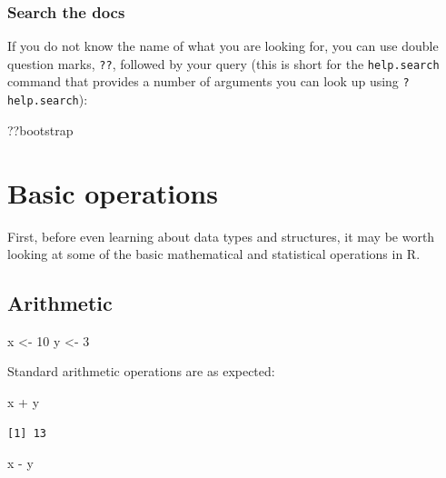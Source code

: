 \documentclass[
]{book}
\newenvironment{Shaded}{\begin{snugshade}}{\end{snugshade}}
\newcommand{\DecValTok}[1]{\textcolor[rgb]{0.00,0.00,0.81}{#1}}
\newcommand{\NormalTok}[1]{#1}
\newcommand{\OtherTok}[1]{\textcolor[rgb]{0.56,0.35,0.01}{#1}}
\newcommand{\SpecialCharTok}[1]{\textcolor[rgb]{0.00,0.00,0.00}{#1}}
\begin{document}
\hypertarget{search-the-docs}{%
\subsection{Search the docs}\label{search-the-docs}}

If you do not know the name of what you are looking for, you can use double question marks, \texttt{??}, followed by your query (this is short for the \texttt{help.search} command that provides a number of arguments you can look up using \texttt{?help.search}):

\begin{Shaded}
\begin{Highlighting}[]
\NormalTok{??bootstrap}
\end{Highlighting}
\end{Shaded}

\hypertarget{basicops}{%
\chapter{Basic operations}\label{basicops}}

First, before even learning about data types and structures, it may be worth looking at some of the basic mathematical and statistical operations in R.

\hypertarget{arithmetic}{%
\section{Arithmetic}\label{arithmetic}}

\begin{Shaded}
\begin{Highlighting}[]
\NormalTok{x }\OtherTok{\textless{}{-}} \DecValTok{10}
\NormalTok{y }\OtherTok{\textless{}{-}} \DecValTok{3}
\end{Highlighting}
\end{Shaded}

Standard arithmetic operations are as expected:

\begin{Shaded}
\begin{Highlighting}[]
\NormalTok{x }\SpecialCharTok{+}\NormalTok{ y}
\end{Highlighting}
\end{Shaded}

\begin{verbatim}
[1] 13
\end{verbatim}

\begin{Shaded}
\begin{Highlighting}[]
\NormalTok{x }\SpecialCharTok{{-}}\NormalTok{ y}
\end{Highlighting}
\end{Shaded}
\end{document}
